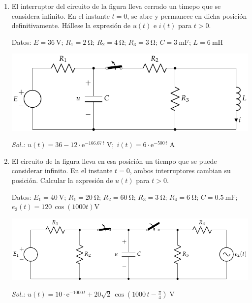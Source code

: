 \begin{enumerate}
\item El interruptor del circuito de la figura lleva cerrado un timepo
  que se considera infinito. En el instante $t=0$, se abre y permanece
  en dicha posición definitivamente. Hállese la expresión de $u(t)$ e
  $i(t)$ para $t>0$.

  Datos:\; $E = \qty{36}{\volt}$;\; $R_1 = \qty{2}{\ohm}$;\;
  $R_2 = \qty{4}{\ohm}$; $R_3 = \qty{3}{\ohm}$;\;
  $C = \qty{3}{\milli\farad}$; $L = \qty{6}{\milli\henry}$

\begin{center}
  \includegraphics{../figs/BT4_03.pdf}
\end{center}

\emph{Sol.:\;
  $u(t)=36-12\cdot\mathrm{e}^{-166.67\,t}\;\si{\volt};\;
  i(t)=6\cdot\mathrm{e}^{-500\,t}\;\si{\ampere}$}

\item El circuito de la figura lleva en esa posición un tiempo que se
  puede considerar infinito. En el instante $t=0$, ambos interruptores
  cambian su posición. Calcular la expresión de $u(t)$ para $t>0$.

  Datos:\; $E_1 = \qty{40}{\volt}$;\; $R_1 = \qty{20}{\ohm}$;\;
  $R_2 = \qty{60}{\ohm}$;\; $R_3 = \qty{3}{\ohm}$;\;
  $R_4 = \qty{6}{\ohm}$;\; $C = \qty{0.5}{\milli\farad}$;\;
  $e_2(t) = 120 \, \cos(1000t)\unit{\volt}$

  \begin{center}
    \includegraphics{../figs/BT4_04.pdf}
  \end{center}

  \emph{Sol.:\;
    $u(t)=10\cdot\mathrm{e}^{-1000\,t}+20\sqrt{2}\,\cos\left(1000\,t-\frac{\pi}{4}\right)\;\si{\volt}$}


\end{enumerate}
